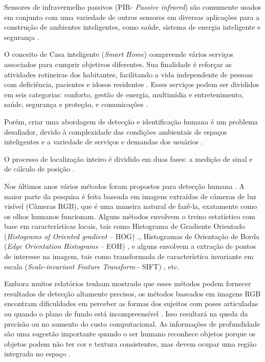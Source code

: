 Sensores de infravermelho passivos (PIR- \textit{Passive infrared}) são comumente usados em conjunto com uma variedade de outros sensores em diversas aplicações para a construção de ambientes inteligentes, como saúde, sistema de energia inteligente e segurança \cite{yun2014human}.

O conceito de Casa inteligente (\textit{Smart Home}) compreende vários serviços associados para cumprir objetivos diferentes. Sua finalidade é reforçar as atividades rotineiras dos habitantes, facilitando a vida independente de pessoas com deficiência, pacientes e idosos residentes \cite{al2014advanced}. Esses serviços podem ser divididos em seis categorias: conforto, gestão de energia, multimídia e entretenimento, saúde, segurança e proteção, e comunicações \cite{dewsbury2001process}.

Porém, criar uma abordagem de detecção e identificação humana é um problema desafiador, devido à complexidade das condições ambientais de espaços inteligentes e a variedade de serviços e demandas dos usuários \cite{al2014advanced}.

O processo de localização inteiro é dividido em duas fases: a medição de sinal e de cálculo de posição \cite{zhang2010localization}. 

Nos últimos anos vários métodos foram propostos para detecção humana \cite{dalal2005,dalal2006,ikemura2011,schwartz2009}. A maior parte da pesquisa é feita baseada em imagens extraídas de câmeras de luz visível (Câmeras RGB), que é uma maneira natural de fazê-la, exatamente como os olhos humanos funcionam. Alguns métodos envolvem o treino estatístico com base em características locais, tais como Histograma de Gradiente Orientado (\textit{Histograms of Oriented gradient} – HOG) \cite{dalal2005}., Histogramas de Orientação de Borda (\textit{Edge Orientation Histograms} – EOH) \cite{levi2004}, e alguns envolvem a extração de pontos de interesse na imagem, tais como transformada de característica invariante em escala (\textit{Scale-invariant Feature Transform} - SIFT) \cite{lowe1999}, etc.

Embora muitos relatórios tenham mostrado que esses métodos podem fornecer resultados de detecção altamente precisos, os métodos baseados em imagens RGB encontram dificuldades em perceber as formas dos sujeitos com poses articuladas ou quando o plano de fundo está incompreensível \cite{xia2011human}. Isso resultará na queda da precisão ou no aumento do custo computacional. As informações de profundidade são uma sugestão importante quando o ser humano reconhece objetos porque os objetos podem não ter cor e textura consistentes, mas devem ocupar uma região integrada no espaço \cite{xia2011human}. 

